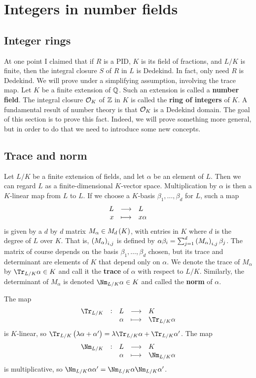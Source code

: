 \pagebreak

\section{Integers in number fields}

\subsection{Integer rings}

At one point I claimed that if $ R $ is a PID, $ K $ is its field of fractions, and $ L / K $ is finite, then the integral closure $ S $ of $ R $ in $ L $ is Dedekind. In fact, only need $ R $ is Dedekind. We will prove under a simplifying assumption, involving the trace map. Let $ K $ be a finite extension of $ \mathbb{Q} $. Such an extension is called a \textbf{number field}. The integral closure $ \mathcal{O}_K $ of $ \mathbb{Z} $ in $ K $ is called the \textbf{ring of integers} of $ K $. A fundamental result of number theory is that $ \mathcal{O}_K $ is a Dedekind domain. The goal of this section is to prove this fact. Indeed, we will prove something more general, but in order to do that we need to introduce some new concepts.

\subsection{Trace and norm}

Let $ L / K $ be a finite extension of fields, and let $ \alpha $ be an element of $ L $. Then we can regard $ L $ as a finite-dimensional $ K $-vector space. Multiplication by $ \alpha $ is then a $ K $-linear map from $ L $ to $ L $. If we choose a $ K $-basis $ \beta_1, \dots, \beta_d $ for $ L $, such a map
$$ \function{L}{L}{x}{x\alpha} $$
is given by a $ d $ by $ d $ matrix $ M_\alpha \in M_d\br{K} $, with entries in $ K $ where $ d $ is the degree of $ L $ over $ K $. That is, $ \br{M_\alpha}_{i, j} $ is defined by $ \alpha\beta_i = \sum_{j = 1}^d \br{M_\alpha}_{i, j}\beta_j $. The matrix of course depends on the basis $ \beta_1, \dots, \beta_d $ chosen, but its trace and determinant are elements of $ K $ that depend only on $ \alpha $. We denote the trace of $ M_\alpha $ by $ \Tr_{L / K} \alpha \in K $ and call it the \textbf{trace} of $ \alpha $ with respect to $ L / K $. Similarly, the determinant of $ M_\alpha $ is denoted $ \Nm_{L / K} \alpha \in K $ and called the \textbf{norm} of $ \alpha $.

\begin{lemma}
The map
$$ \function[\Tr_{L / K}]{L}{K}{\alpha}{\Tr_{L / K} \alpha} $$
is $ K $-linear, so $ \Tr_{L / K} \br{\lambda\alpha + \alpha'} = \lambda \Tr_{L / K} \alpha + \Tr_{L / K} \alpha' $. The map
$$ \function[\Nm_{L / K}]{L}{K}{\alpha}{\Nm_{L / K} \alpha} $$
is multiplicative, so $ \Nm_{L / K} \alpha\alpha' = \Nm_{L / K} \alpha\Nm_{L / K} \alpha' $.
\end{lemma}

